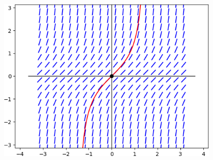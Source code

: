 \documentclass[11pt]{amsart}
\begin{document}
\begin{center}
\includegraphics[width=0.8\textwidth]{figs/probBfield.png}
\end{center}
\vfill
\end{document}
